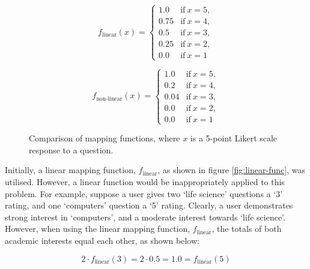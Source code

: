 \begin{figure}[H]
    \centering
    \begin{minipage}{0.45\textwidth}
        \centering
        \[ 
        f_{\text{linear}}(x) = \begin{cases}
                1.0 & \text{if}\: x=5,\\
                0.75 & \text{if}\: x=4, \\
                0.5 & \text{if}\: x=3, \\
                0.25 & \text{if}\: x=2,\\
                0.0 & \text{if}\: x=1
        \end{cases}
        \]
        \label{fig:linear-func}
    \end{minipage}
    \hfill
    \begin{minipage}{0.45\textwidth}
        \centering
        \[ 
        f_{\text{non-linear}}(x) = \begin{cases}
                1.0 & \text{if}\: x=5,\\
                0.2 & \text{if}\: x=4, \\
                0.04 & \text{if}\: x=3, \\
                0.0 & \text{if}\: x=2,\\
                0.0 & \text{if}\: x=1
        \end{cases}
        \]
        \label{fig:non-linear-func}
    \end{minipage}
    \caption{Comparison of mapping functions, where $x$ is a 5-point Likert scale response to a question.}  
\end{figure}

Initially, a linear mapping function, $f_{\text{linear}}$, as shown in figure \ref{fig:linear-func}, was utilised.
However, a linear function would be inappropriately applied to this problem.
For example, suppose a user gives two `life science' questions a `3' rating,
and one `computers' question a `5' rating.
Clearly, a user demonstrates strong interest in `computers', and a moderate interest towards `life science'.
However, when using the linear mapping function, $f_{\text{linear}}$, the totals of both academic interests equal each other, as shown below:

\[ 2 \cdot f_{\text{linear}}(3) = 2 \cdot 0.5 = 1.0 = f_{\text{linear}}(5) \]

